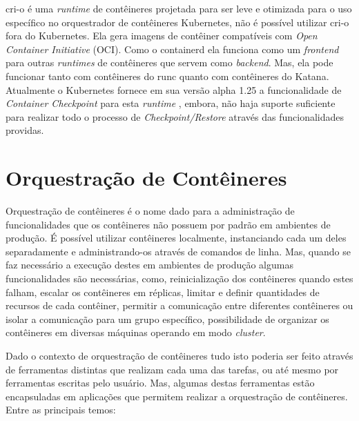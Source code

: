 cri-o é uma \textit{runtime} de contêineres projetada para ser leve e otimizada
para o uso específico no orquestrador de contêineres Kubernetes, não é possível
utilizar cri-o fora do Kubernetes\cite{cri-o}. Ela gera imagens de contêiner
compatíveis com \textit{Open Container Initiative} (OCI). Como o containerd ela
funciona como um \textit{frontend} para outras \textit{runtimes} de contêineres
que servem como \textit{backend}. Mas, ela pode funcionar tanto com contêineres
do runc quanto com contêineres do Katana. Atualmente o Kubernetes fornece em sua
versão alpha 1.25 a funcionalidade de \textit{Container Checkpoint} para esta
\textit{runtime} \cite{kubernetes:checkpoint}, embora, não haja suporte suficiente
para realizar todo o processo de \textit{Checkpoint/Restore} através das
funcionalidades providas.

\section{Orquestração de Contêineres}

Orquestração de contêineres é o nome dado para a administração de funcionalidades
que os contêineres não possuem por padrão em ambientes de produção. É possível
utilizar contêineres localmente, instanciando cada um deles separadamente e
administrando-os através de comandos de linha. Mas, quando se faz necessário a
execução destes em ambientes de produção algumas funcionalidades são necessárias,
como, reinicialização dos contêineres quando estes falham, escalar os contêineres
em réplicas, limitar e definir quantidades de recursos de cada contêiner, permitir
a comunicação entre diferentes contêineres ou isolar a comunicação para um grupo
específico, possibilidade de organizar os contêineres em diversas máquinas operando
em modo \textit{cluster}.

Dado o contexto de orquestração de contêineres tudo isto poderia ser feito através
de ferramentas distintas que realizam cada uma das tarefas, ou até mesmo por
ferramentas escritas pelo usuário. Mas, algumas destas ferramentas estão encapsuladas
em aplicações que permitem realizar a orquestração de contêineres. Entre as principais
temos:

